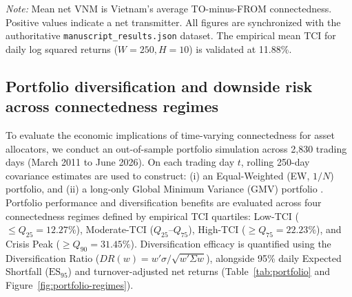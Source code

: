 \documentclass[12pt,a4paper]{article}
\begin{document}
\begin{table}[H]
\centering
\caption{Selected robustness results}
\label{tab:robustness}
\begin{minipage}{0.92\textwidth}
\footnotesize\textit{Note:} Mean net VNM is Vietnam's average TO-minus-FROM connectedness. Positive values indicate a net transmitter. All figures are synchronized with the authoritative \texttt{manuscript\_results.json} dataset. The empirical mean TCI for daily log squared returns ($W=250, H=10$) is validated at 11.88\%.
\end{minipage}
\end{table}

\subsection{Portfolio diversification and downside risk across connectedness regimes}
\label{sec:portfolio}

To evaluate the economic implications of time-varying connectedness for asset allocators, we conduct an out-of-sample portfolio simulation across 2,830 trading days (March 2011 to June 2026). On each trading day $t$, rolling 250-day covariance estimates are used to construct: (i) an Equal-Weighted (EW, $1/N$) portfolio, and (ii) a long-only Global Minimum Variance (GMV) portfolio \citep{BesslerEtAl2021}. Portfolio performance and diversification benefits are evaluated across four connectedness regimes defined by empirical TCI quartiles: Low-TCI ($\le Q_{25} = 12.27\%$), Moderate-TCI ($Q_{25}$--$Q_{75}$), High-TCI ($\ge Q_{75} = 22.23\%$), and Crisis Peak ($\ge Q_{90} = 31.45\%$). Diversification efficacy is quantified using the \citet{ChoueifatyCoignard2008} Diversification Ratio ($DR(w) = w'\sigma / \sqrt{w'\Sigma w}$), alongside 95\% daily Expected Shortfall ($\text{ES}_{95}$) and turnover-adjusted net returns (Table~\ref{tab:portfolio} and Figure~\ref{fig:portfolio-regimes}).
\end{document}

